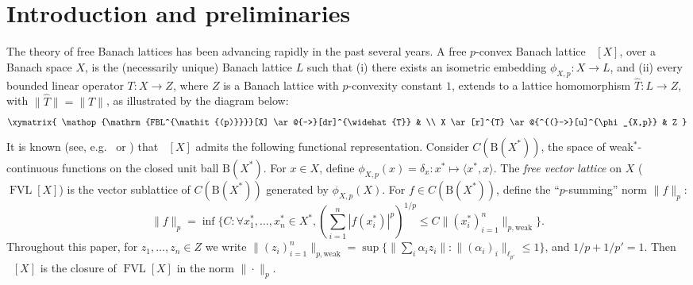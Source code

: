 \documentclass{amsart}
\theoremstyle{plain}
\theoremstyle{definition}
\numberwithin{equation}{section}
\newcommand{\ball}{\mathrm{B}}
\DeclareMathOperator{\FVL}{FVL}
\DeclareMathOperator{\FBLp}{FBL^{\mathit{(p)}}}
\begin{document}
\maketitle

\section{Introduction and preliminaries}\label{sec:intro}

The theory of free Banach lattices has been advancing rapidly in the past several years. A free $p$-convex Banach lattice $\FBLp[X]$, over a Banach space $X$, is the (necessarily unique) Banach lattice $L$ such that (i) there exists an isometric embedding $\phi_{X,p}: X \to L$, and (ii) every bounded linear operator $T : X \to Z$, where $Z$ is a Banach lattice with $p$-convexity constant $1$, extends to a lattice homomorphism $\widehat{T}: L \to Z$, with $\|\widehat{T}\| = \|T\|$, as illustrated by the diagram below:
$$
\xymatrix{
 \FBLp[X] \ar@{-->}[dr]^{\widehat{T}}  &   \\
  X \ar[r]^{T} \ar@{^{(}->}[u]^{\phi_{X,p}}  & Z } 
$$
It is known (see, e.g.~\cite{OiTTT} or \cite{GSLTT}) that $\FBLp[X]$ admits the following functional representation. Consider $C(\ball(X^*))$, the space of weak$^*$-continuous functions on the closed unit ball $\ball(X^*)$.
For $x \in X$, define $\phi_{X,p}(x) = \delta_x : x^* \mapsto \langle x^*,x\rangle$.
The \emph{free vector lattice} on $X$ ($\FVL[X]$) is the vector sublattice of $C(\ball(X^*))$ generated by $\phi_{X,p}(X)$.
For $f \in C(\ball(X^*))$, define the ``$p$-summing'' norm $\|f\|_p$: %
\begin{equation}
\|f\|_p = \inf \big\{ C : \forall x_1^*, \ldots, x_n^* \in X^*, (\sum_{i=1}^n |f(x_i^*)|^p)^{1/p} \leq C \|(x_i^*)_{i=1}^n\|_{p, {\textrm{weak}}} \big\} .
\label{def of p-norm}
\end{equation}
Throughout this paper, for $z_1, \ldots, z_n \in Z$ we write $\|(z_i)_{i=1}^n\|_{p, {\textrm{weak}}} = \sup \big\{ \| \sum_i \alpha_i z_i \| : \|(\alpha_i)_i\|_{\ell_{p'}} \leq 1 \big\}$, and $1/p + 1/p' = 1$. Then $\FBLp[X]$ is the closure of $\FVL[X]$ in the norm $\| \cdot \|_p$. %
\end{document}
